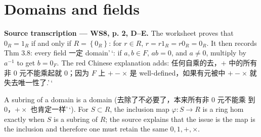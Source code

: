 \section{Domains and fields}

\textbf{Source transcription --- WS8, p. 2, D--E.} The worksheet proves that \(0_{R} = 1_{R}\) if and only if \(R = \left\{ 0_{R} \right\}\): for \(r \in R\), \(r = r1_{R} = r0_{R} = 0_{R}\). It then records Thm 3.8: every field 一定 domain'\,`: if \(a,b \in F\), \(ab = 0\), and \(a \neq 0\), multiply by \(a^{- 1}\) to get \(b = 0_{F}\). The red Chinese explanation adds: 任何自乘的去，\(+\) 中的所有非 0 元不能乘起就 0；因为 \(F\) 上 \(+ - \times\) 是 well-defined，如果有元被中 \(+ - \times\) 就失去唯一性了.'\,`

A subring of a domain is a domain (去除了不必要了，本来所有非 0 元不能乘 到 0，\(+ \times\) 也肯定一样'\,`). For \(S \subset R\), the inclusion map \(\varphi:S\rightarrow R\) is a ring hom exactly when \(S\) is a subring of \(R\); the source explains that the issue is the map is the inclusion and therefore one must retain the same \(0,1, + , \times\).
